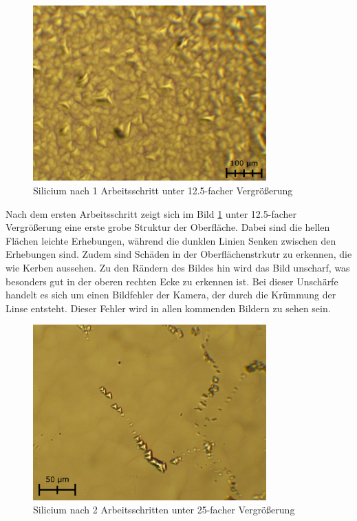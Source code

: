 \documentclass[german, %
parskip=full, %
bibliography=totoc, %
]{scrartcl}
\begin{document}
\begin{figure}[ht] 
  \centering
     \includegraphics[width=0.8\textwidth]{Silicium_1_12}
  \caption{Silicium nach 1 Arbeitsschritt unter 12.5-facher Vergrößerung}
  \label{fig:sil112}
\end{figure}

Nach dem ersten Arbeitsschritt zeigt sich im Bild \ref{fig:sil112} unter 12.5-facher Vergrößerung eine erste grobe Struktur der Oberfläche. Dabei sind die hellen Flächen leichte Erhebungen, während die dunklen Linien Senken zwischen den Erhebungen sind. Zudem sind Schäden in der Oberflächenstrkutr zu erkennen, die wie Kerben aussehen. Zu den Rändern des Bildes hin wird das Bild unscharf, was besonders gut in der oberen rechten Ecke zu erkennen ist. Bei dieser Unschärfe handelt es sich um einen Bildfehler der Kamera, der durch die Krümmung der Linse entsteht. Dieser Fehler wird in allen kommenden Bildern zu sehen sein.

\begin{figure}[ht] 
  \centering
     \includegraphics[width=0.8\textwidth]{Silicium_2_25}
  \caption{Silicium nach 2 Arbeitsschritten unter 25-facher Vergrößerung}
  \label{fig:sil225}
\end{figure}
\end{document}

